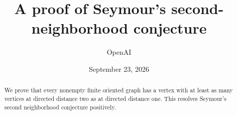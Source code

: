 \documentclass[11pt]{article}
\title{A proof of Seymour's second-neighborhood conjecture}
\author{OpenAI}
\date{September 23, 2026}
\theoremstyle{remark}
\begin{document}
\maketitle
\begin{abstract}
We prove that every nonempty finite oriented graph has a vertex with at least
as many vertices at directed distance two as at directed distance one.
This resolves Seymour's second neighborhood conjecture positively.
\end{abstract}








\end{document}
